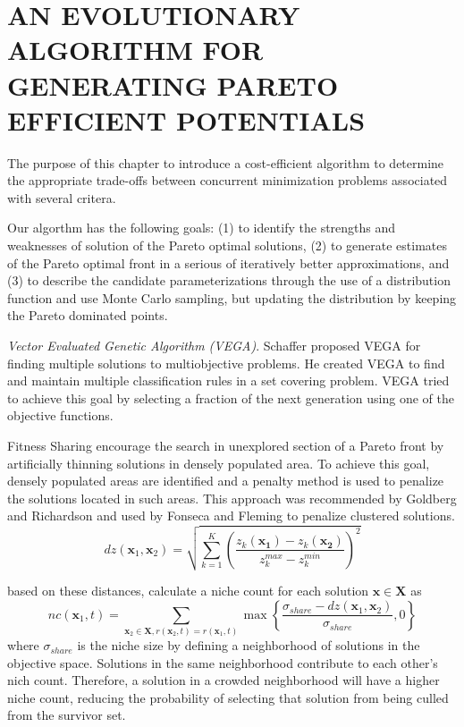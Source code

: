 \chapter{AN EVOLUTIONARY ALGORITHM FOR GENERATING PARETO EFFICIENT POTENTIALS}

The purpose of this chapter to introduce a cost-efficient algorithm to determine the appropriate trade-offs between concurrent minimization problems associated with several critera.

Our algorthm has the following goals: (1) to identify the strengths and weaknesses of solution of the Pareto optimal solutions, (2) to generate estimates of the Pareto optimal front in a serious of iteratively better approximations, and (3) to describe the candidate parameterizations through the use of a distribution function and use Monte Carlo sampling, but updating the distribution by keeping the Pareto dominated points.


\emph{Vector Evaluated Genetic Algorithm (VEGA)}.  Schaffer proposed VEGA for finding multiple solutions to multiobjective problems.  He created VEGA to find and maintain multiple classification rules in a set covering problem.  VEGA tried to achieve this goal by selecting a fraction of the next generation using one of the objective functions.

Fitness Sharing encourage the search in unexplored section of a Pareto front by artificially thinning solutions in densely populated area.  To achieve this goal, densely populated areas are identified and a penalty method is used to penalize the solutions located in such areas.  This approach was recommended by Goldberg and Richardson\cite{goldberg1987genetic} and used by Fonseca and Fleming\cite{fonseca1993multiobjective} to penalize clustered solutions.
\begin{equation}
    dz(\bm{x}_1,\bm{x}_2)
    = \sqrt{\sum_{k=1}^{K}  \left(\frac{z_k(\bm{x_1})-z_k(\bm{x_2})}
                                       {z_{k}^{max}-z_{k}^{min}}
                            \right)^{2}
      }
\end{equation}

based on these distances, calculate a niche count for each solution $\bm{x}\in\bm{X}$ as
\begin{equation}
  nc(\bm{x}_1,t)=\sum_{\bm{x}_2\in\bm{X},r(\bm{x}_2,t)=r(\bm{x}_1,t)}
      \max\left\{ \frac{\sigma_{share}-dz(\bm{x}_1,\bm{x}_2)}
                       {\sigma_{share}},0
          \right\}
\end{equation}
where $\sigma_{share}$ is the niche size by defining a neighborhood of solutions in the objective space.  Solutions in the same neighborhood contribute to each other's nich count.  Therefore, a solution in a crowded neighborhood will have a higher niche count, reducing the probability of selecting that solution from being culled from the survivor set.

